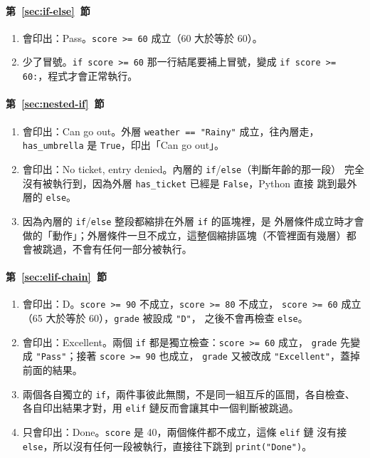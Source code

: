\paragraph{第~\ref{sec:if-else}~節}
\begin{enumerate}
\item 會印出：Pass。\texttt{score >= 60} 成立（60 大於等於 60）。
\item 少了冒號。\texttt{if score >= 60} 那一行結尾要補上冒號，變成
\texttt{if score >= 60:}，程式才會正常執行。
\end{enumerate}

\paragraph{第~\ref{sec:nested-if}~節}
\begin{enumerate}
\item 會印出：Can go out。外層 \texttt{weather == "Rainy"} 成立，往內層走，
\texttt{has\_umbrella} 是 \texttt{True}，印出「Can go out」。
\item 會印出：No ticket, entry denied。內層的 \texttt{if}/\texttt{else}（判斷年齡的那一段）
完全沒有被執行到，因為外層 \texttt{has\_ticket} 已經是 \texttt{False}，Python 直接
跳到最外層的 \texttt{else}。
\item 因為內層的 \texttt{if}/\texttt{else} 整段都縮排在外層 \texttt{if} 的區塊裡，是
外層條件成立時才會做的「動作」；外層條件一旦不成立，這整個縮排區塊（不管裡面有幾層）都
會被跳過，不會有任何一部分被執行。
\end{enumerate}

\paragraph{第~\ref{sec:elif-chain}~節}
\begin{enumerate}
\item 會印出：D。\texttt{score >= 90} 不成立，\texttt{score >= 80} 不成立，
\texttt{score >= 60} 成立（65 大於等於 60），\texttt{grade} 被設成 \texttt{"D"}，
之後不會再檢查 \texttt{else}。
\item 會印出：Excellent。兩個 \texttt{if} 都是獨立檢查：\texttt{score >= 60} 成立，
\texttt{grade} 先變成 \texttt{"Pass"}；接著 \texttt{score >= 90} 也成立，
\texttt{grade} 又被改成 \texttt{"Excellent"}，蓋掉前面的結果。
\item 兩個各自獨立的 \texttt{if}，兩件事彼此無關，不是同一組互斥的區間，各自檢查、
各自印出結果才對，用 \texttt{elif} 鏈反而會讓其中一個判斷被跳過。
\item 只會印出：Done。\texttt{score} 是 40，兩個條件都不成立，這條 \texttt{elif} 鏈
沒有接 \texttt{else}，所以沒有任何一段被執行，直接往下跳到 \texttt{print("Done")}。
\end{enumerate}

